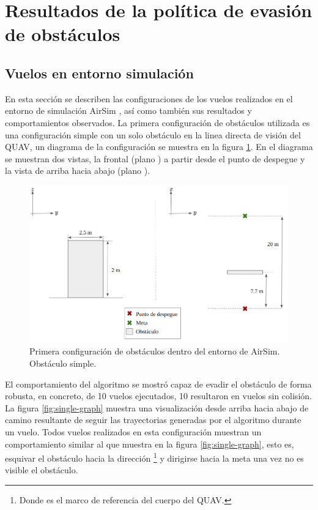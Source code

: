 \section{Resultados de la política de evasión de obstáculos}

\label{sec:results-flights}

\subsection{Vuelos en entorno simulación}

\label{sec:results-AirSim}

En esta sección se describen las configuraciones de los vuelos realizados en el entorno de simulación AirSim \cite{shah2018airsim}, así como también sus resultados y comportamientos observados. La primera configuración de obstáculos utilizada es una configuración simple con un solo obstáculo en la linea directa de visión del QUAV, un diagrama de la configuración se muestra en la figura \ref{fig:config-1-single}. En el diagrama se muestran dos vistas, la frontal (plano ) a partir desde el punto de despegue y la vista de arriba hacia abajo (plano ).

\begin{figure}[H]
    \centering
    \includegraphics[scale=0.35]{partes/ImgJoao/config-1-single.png}
    \caption[Primera configuración de obstáculos dentro del entorno de AirSim.]{Primera configuración de obstáculos dentro del entorno de AirSim. Obstáculo simple.}
    \label{fig:config-1-single}
\end{figure}

El comportamiento del algoritmo se mostró capaz de evadir el obstáculo de forma robusta, en concreto, de 10 vuelos ejecutados, 10 resultaron en vuelos sin colisión. La figura \ref{fig:single-graph} muestra una visualización desde arriba hacia abajo de camino resultante de seguir las trayectorias generadas por el algoritmo durante un vuelo. Todos vuelos realizados en esta configuración muestran un comportamiento similar al que muestra en la figura \ref{fig:single-graph}, esto es, esquivar el obstáculo hacia la dirección \footnote{Donde  es el marco de referencia del cuerpo del QUAV.} y dirigirse hacia la meta una vez no es visible el obstáculo.

